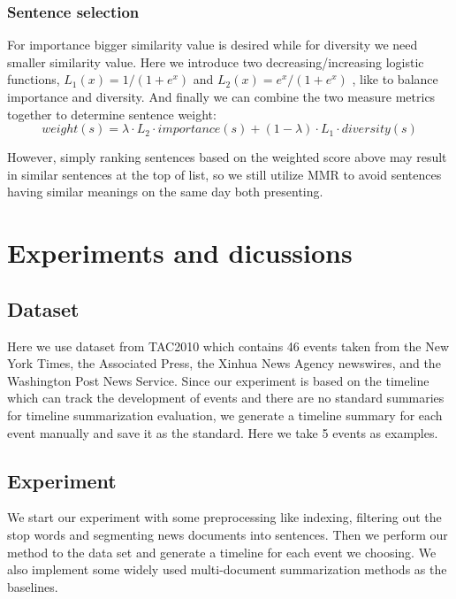 \documentclass[runningheads,a4paper]{llncs}
\begin{document}
\subsubsection{Sentence selection}

For importance bigger similarity value is desired while for diversity we need smaller similarity value. Here we introduce two decreasing/increasing logistic functions,  $L_1(x) = 1/(1+e^x)$  and $L_2(x) = e^x / (1+e^x)$ , like \cite{2011-Yan-p745-754} to balance importance and diversity. And finally we can combine the two measure metrics together to determine sentence weight:
\begin{equation}
weight(s) = \lambda \cdot L_2 \cdot importance(s) + (1- \lambda ) \cdot L_1 \cdot  diversity(s)
\end{equation}

However, simply ranking sentences based on the weighted score above may result in similar sentences at the top of list, so we still utilize MMR \cite{1998-Carbonell-p335-336} to avoid sentences having similar meanings on the same day both presenting.

\section{Experiments and dicussions}
\subsection{Dataset}
Here we use dataset from TAC2010 which contains 46 events taken from the New York Times, the Associated Press, the Xinhua News Agency newswires, and the Washington Post News Service. Since our experiment is based on the timeline which can track the development of events and there are no standard summaries for timeline summarization evaluation, we generate a timeline summary for each event manually and save it as the standard. Here we take 5 events as examples.
\subsection{Experiment}
\label{methodsection}

We start our experiment with some preprocessing like indexing, filtering out the stop words and segmenting news documents into sentences. Then we perform our method to the data set and generate a timeline for each event we choosing. We also implement some widely used multi-document summarization methods as the baselines.
\end{document}
